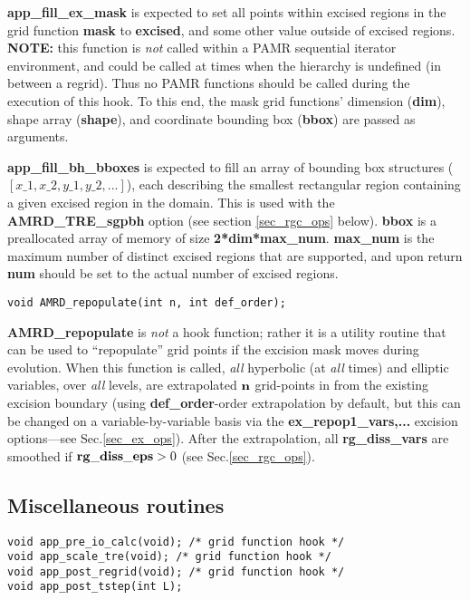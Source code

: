 \documentclass[aps,amssymb,unsortedaddress,nofootinbib]{revtex4}
\begin{document}
{\bf app\_fill\_ex\_mask} is expected to set all points within excised regions in the
grid function {\bf mask} to {\bf excised}, and some other value outside of excised regions.
{\bf NOTE:} this function is {\em not} called within a PAMR sequential iterator environment,
and could be called at times when the hierarchy is undefined (in between a regrid). Thus
no PAMR functions should be called during the execution of this hook. To this end,
the mask grid functions' dimension ({\bf dim}), shape array ({\bf shape}), and coordinate bounding
box ({\bf bbox}) are passed as arguments.\par
{\bf app\_fill\_bh\_bboxes} is expected to fill an array of bounding box 
structures ($[x\_1,x\_2,y\_1,y\_2,...]$),
each describing the smallest rectangular region containing a given excised region
in the domain. This is used with the {\bf AMRD\_TRE\_sgpbh} option (see section \ref{sec_rgc_ops} below).
{\bf bbox} is a preallocated array of memory of size {\bf 2*dim*max\_num}. {\bf max\_num} is
the maximum number of distinct excised regions that are supported, and upon return {\bf num}
should be set to the actual number of excised regions.

\begin{verbatim}
void AMRD_repopulate(int n, int def_order);
\end{verbatim}

{\bf AMRD\_repopulate} is {\em not} a hook function; rather it is a utility routine
that can be used to ``repopulate'' grid points if the excision mask moves during
evolution. When this function is called, {\em all} hyperbolic (at {\em all} times) and elliptic variables,
over {\em all} levels,
are extrapolated $\bf n$ grid-points in from the existing excision boundary
(using {\bf def\_order}-order extrapolation by default,
but this can be changed on a variable-by-variable basis via the {\bf ex\_repop1\_vars,...}
excision options---see Sec.\ref{sec_ex_ops}). After the extrapolation, all
{\bf rg\_diss\_vars} are smoothed if ${\bf rg\_diss\_eps}>0$ (see Sec.\ref{sec_rgc_ops}).

\subsection{Miscellaneous routines}

\begin{verbatim}
void app_pre_io_calc(void); /* grid function hook */
void app_scale_tre(void); /* grid function hook */
void app_post_regrid(void); /* grid function hook */
void app_post_tstep(int L); 
\end{verbatim}
\end{document}
